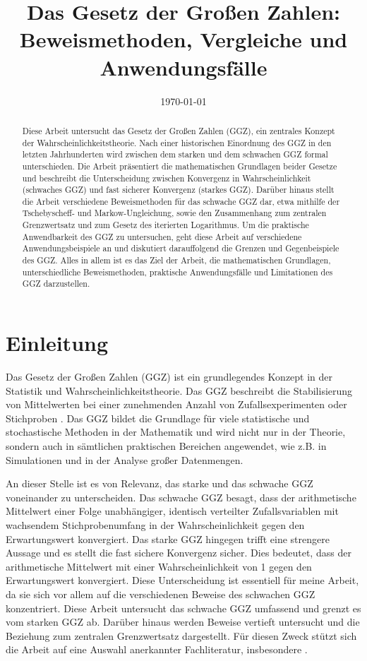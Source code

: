 \documentclass[12pt,a4paper]{article}
\title{Das Gesetz der Großen Zahlen: Beweismethoden, Vergleiche und Anwendungsfälle}
\date{\today}
\begin{document}
\maketitle

\newpage

\begin{abstract}
    Diese Arbeit untersucht das Gesetz der Großen Zahlen (GGZ), ein zentrales Konzept der Wahrscheinlichkeitstheorie.
    Nach einer historischen Einordnung des GGZ in den letzten Jahrhunderten wird zwischen dem starken und dem schwachen GGZ formal unterschieden.
    Die Arbeit präsentiert die mathematischen Grundlagen beider Gesetze und beschreibt die Unterscheidung zwischen Konvergenz in Wahrscheinlichkeit (schwaches GGZ) und fast sicherer Konvergenz (starkes GGZ).
    Darüber hinaus stellt die Arbeit verschiedene Beweismethoden für das schwache GGZ dar, etwa mithilfe der Tschebyscheff- und Markow-Ungleichung, sowie den Zusammenhang zum zentralen Grenzwertsatz und zum Gesetz des iterierten Logarithmus.
    Um die praktische Anwendbarkeit des GGZ zu untersuchen, geht diese Arbeit auf verschiedene Anwendungsbeispiele an und diskutiert darauffolgend die Grenzen und Gegenbeispiele des GGZ.
    Alles in allem ist es das Ziel der Arbeit, die mathematischen Grundlagen, unterschiedliche Beweismethoden, praktische Anwendungsfälle und Limitationen des GGZ darzustellen.
\end{abstract}

\section{Einleitung}
\label{sec:einleitung}
Das Gesetz der Großen Zahlen (GGZ) ist ein grundlegendes Konzept in der Statistik und Wahrscheinlichkeitstheorie.
Das GGZ beschreibt die Stabilisierung von Mittelwerten bei einer zunehmenden Anzahl von Zufallsexperimenten oder Stichproben \citep{degroot2021}.
Das GGZ bildet die Grundlage für viele statistische und stochastische Methoden in der Mathematik und wird nicht nur in der Theorie, sondern auch in sämtlichen praktischen Bereichen angewendet, wie z.B. in Simulationen und in der Analyse großer Datenmengen.


An dieser Stelle ist es von Relevanz, das starke und das schwache GGZ voneinander zu unterscheiden.
Das schwache GGZ besagt, dass der arithmetische Mittelwert einer Folge unabhängiger, identisch verteilter Zufallsvariablen mit wachsendem Stichprobenumfang in der Wahrscheinlichkeit gegen den Erwartungswert konvergiert.
Das starke GGZ hingegen trifft eine strengere Aussage und es stellt die fast sichere Konvergenz sicher.
Dies bedeutet, dass der arithmetische Mittelwert mit einer Wahrscheinlichkeit von 1 gegen den Erwartungswert konvergiert.
Diese Unterscheidung ist essentiell für meine Arbeit, da sie sich vor allem auf die verschiedenen Beweise des schwachen GGZ konzentriert.
Diese Arbeit untersucht das schwache GGZ umfassend und grenzt es vom starken GGZ ab.
Darüber hinaus werden Beweise vertieft untersucht und die Beziehung zum zentralen Grenzwertsatz dargestellt.
Für diesen Zweck stützt sich die Arbeit auf eine Auswahl anerkannter Fachliteratur, insbesondere \citet{degroot2021, blitzstein2019, stoyanov2013}.
\end{document}
